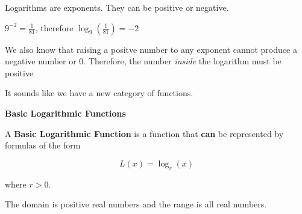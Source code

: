 \documentclass{ximera}
\begin{document}
Logarithms are exponents.  They can be positive or negative.



$9^{-2} = \frac{1}{81}$, therefore  $\log_{9}\left(\frac{1}{81}\right) = -2$



We also know that raising a positve number to any exponent cannot produce a negative number or $0$.  Therefore, the number \textit{inside} the logarithm must be positive



It sounds like we have a new category of functions.




\begin{definition} \textbf{\textcolor{green!50!black}{Basic Logarithmic Functions}}

A \textbf{Basic Logarithmic Function} is a function that \textbf{\textcolor{purple!85!blue}{can}} be represented by formulas of the form

\[     L(x) =    \log_r(x)            \]

where $r > 0$.

The domain is positive real numbers and the range is all real numbers.

\end{definition}
\end{document}
